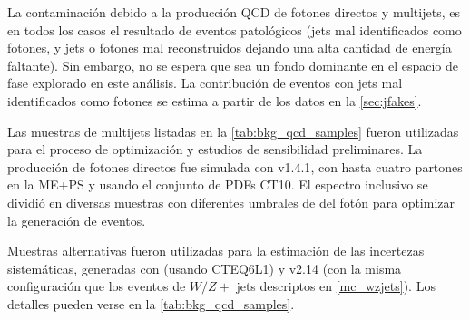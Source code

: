 La contaminación debido a la producción QCD de fotones directos y multijets,
es en todos los casos el resultado de eventos patológicos
(jets mal identificados como fotones, y jets o fotones mal reconstruidos dejando
una alta cantidad de energía faltante). Sin embargo, no se espera que sea un
fondo dominante en el espacio de fase explorado en este análisis. La
contribución de eventos con jets mal identificados como fotones se estima a
partir de los datos en la \cref{sec:jfakes}.

Las muestras de multijets listadas en la \cref{tab:bkg_qcd_samples} fueron
utilizadas para el proceso de optimización y estudios de sensibilidad
preliminares. La producción de fotones directos fue simulada con {\sherpa}
v1.4.1\cite{SherpaGen}, con hasta cuatro partones en la ME+PS y usando el
conjunto de PDFs CT10. El espectro inclusivo se dividió en diversas muestras con
diferentes umbrales de {\pt} del fotón para optimizar la generación de eventos.

Muestras alternativas fueron utilizadas para la estimación de las incertezas
sistemáticas, generadas con {\pythiaeight} (usando CTEQ6L1) y {\alpgen} v2.14
(con la misma configuración que los eventos de $W/Z +$ jets descriptos en
\cref{mc_wzjets}). Los detalles pueden verse en la \cref{tab:bkg_qcd_samples}.


